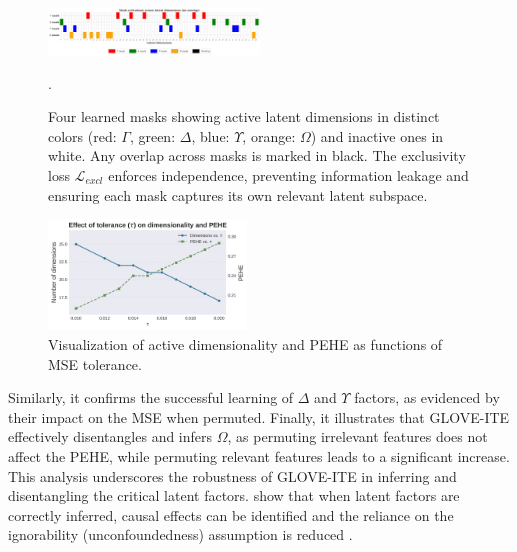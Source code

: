 \documentclass[doubleblind]{ecai}
\begin{document}
	\begin{figure}[h]
		\centering
		
		\includegraphics[width=0.5\textwidth]{Images/orthogonal_new_2.png}
		\caption{
			Four learned masks showing active latent dimensions in distinct colors 
			(red: $\Gamma$, green: $\Delta$, blue: $\Upsilon$, orange: $\Omega$) and inactive ones in white. 
			Any overlap across masks is marked in black. The exclusivity loss $\mathcal{L}_{\mathit{excl}}$ enforces independence, 
			preventing information leakage and ensuring each mask captures its own relevant latent subspace.
		}
		
		.
		
		
		\label{fig:ortho}
		
	\end{figure}


	
	
	\begin{figure}[h]
		\centering
		
		\includegraphics[width=0.47\textwidth]{Images/tol_vs_dims_pehe_new.png}
		
		
		
		\caption{Visualization of active dimensionality and PEHE as functions of MSE tolerance.}
		
		\label{fig:tolerance}
		
	\end{figure}
	
	Similarly, it confirms the successful learning of $\Delta$ and $\Upsilon$ factors, as evidenced by their impact on the MSE when permuted. Finally, it illustrates that GLOVE-ITE effectively disentangles and infers $\Omega$, as permuting irrelevant features does not affect the PEHE, while permuting relevant features leads to a significant increase. This analysis underscores the robustness of GLOVE-ITE in inferring and disentangling the critical latent factors. \citet{CEVAE,lowe2022amortized} show that when latent factors are correctly inferred, causal effects can be identified and the reliance on the ignorability (unconfoundedness) assumption is reduced \citep{vowels2021targeted}. 
	
\end{document}
